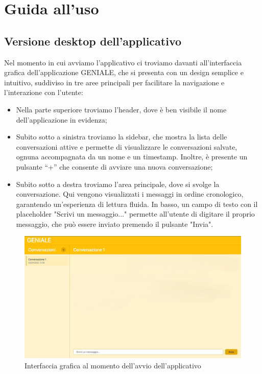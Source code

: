 \section{Guida all'uso}
\subsection{Versione desktop dell'applicativo}
Nel momento in cui avviamo l'applicativo ci troviamo davanti all’interfaccia grafica dell’applicazione GENIALE, che si presenta con un design semplice e intuitivo, suddiviso in tre aree principali per facilitare la navigazione e l’interazione con l’utente:
\begin{itemize}
    \item Nella parte superiore troviamo l’header, dove è ben visibile il nome dell’applicazione in evidenza;
    \item Subito sotto a sinistra troviamo la sidebar, che mostra la lista delle conversazioni attive e permette di visualizzare le conversazioni salvate, ognuna accompagnata da un nome e un timestamp. Inoltre, è presente un pulsante “+” che consente di avviare una nuova conversazione;
    \item Subito sotto a destra troviamo l’area principale, dove si svolge la conversazione. Qui vengono visualizzati i messaggi in ordine cronologico, garantendo un’esperienza di lettura fluida. In basso, un campo di testo con il placeholder "Scrivi un messaggio..." permette all’utente di digitare il proprio messaggio, che può essere inviato premendo il pulsante "Invia".
\end{itemize}
\begin{figure}[H]
\centering
\includegraphics[width=1\textwidth]{contents/img/default_pc.jpg}
\caption{Interfaccia grafica al momento dell'avvio dell'applicativo}
\end{figure}


